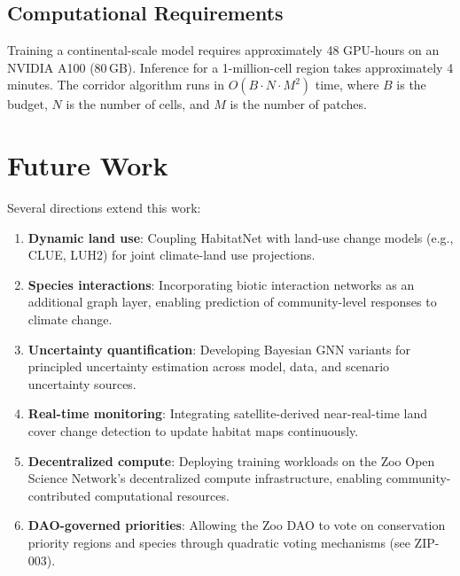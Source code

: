 \documentclass[11pt,a4paper]{article}
\begin{document}
\subsection{Computational Requirements}

Training a continental-scale model requires approximately 48 GPU-hours on
an NVIDIA A100 (80\,GB). Inference for a 1-million-cell region takes
approximately 4 minutes. The corridor algorithm runs in $O(B \cdot N
\cdot M^2)$ time, where $B$ is the budget, $N$ is the number of cells,
and $M$ is the number of patches.


\section{Future Work}
\label{sec:future}

Several directions extend this work:

\begin{enumerate}
  \item \textbf{Dynamic land use}: Coupling HabitatNet with land-use
    change models (e.g., CLUE, LUH2) for joint climate-land use
    projections.
  \item \textbf{Species interactions}: Incorporating biotic interaction
    networks as an additional graph layer, enabling prediction of
    community-level responses to climate change.
  \item \textbf{Uncertainty quantification}: Developing Bayesian GNN
    variants for principled uncertainty estimation across model,
    data, and scenario uncertainty sources.
  \item \textbf{Real-time monitoring}: Integrating satellite-derived
    near-real-time land cover change detection to update habitat maps
    continuously.
  \item \textbf{Decentralized compute}: Deploying training workloads on
    the Zoo Open Science Network's decentralized compute infrastructure,
    enabling community-contributed computational resources.
  \item \textbf{DAO-governed priorities}: Allowing the Zoo DAO to vote
    on conservation priority regions and species through quadratic
    voting mechanisms (see ZIP-003).
\end{enumerate}


\end{document}
